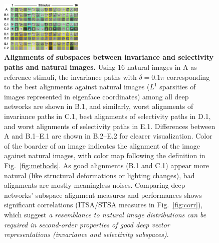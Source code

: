 \documentclass[10pt,twocolumn,letterpaper]{article}
\begin{document}
\begin{figure}
\begin{center}
\includegraphics[width=0.35\textwidth]{Figs/pic3.pdf} 
\end{center}
\caption{{\bf Alignments of subspaces between invariance and selectivity paths and natural images.}
Using 16 natural images in A as reference stimuli, the invariance paths with $\delta = 0.1\pi$ corresponding to the best alignments against natural images (\ie $L^1$ sparsities of images represented in eigenface coordinates) among all deep networks are shown in B.1, and similarly, worst alignments of invariance paths in C.1, best alignments of selectivity paths in D.1, and worst alignments of selectivity paths in E.1.
Differences between A and B.1--E.1 are shown in B.2--E.2 for clearer visualization.
Color of the boarder of an image indicates the alignment of the image against natural images, with color map following the definition in Fig.~\ref{fig:methods}.
As good alignments (B.1 and C.1) appear more natural (like structural deformations or lighting changes), bad alignments are mostly meaningless noises.
Comparing deep networks' subspace alignment measures and performances shows significant correlations (ITSA/STSA measures in Fig.~\ref{fig:corr}), which suggest \emph{a resemblance to natural image distributions can be required in second-order properties of good deep vector representations (\ie invariance and selectivity subspaces)}.
} %
\label{fig:align}
\end{figure}
\end{document}
